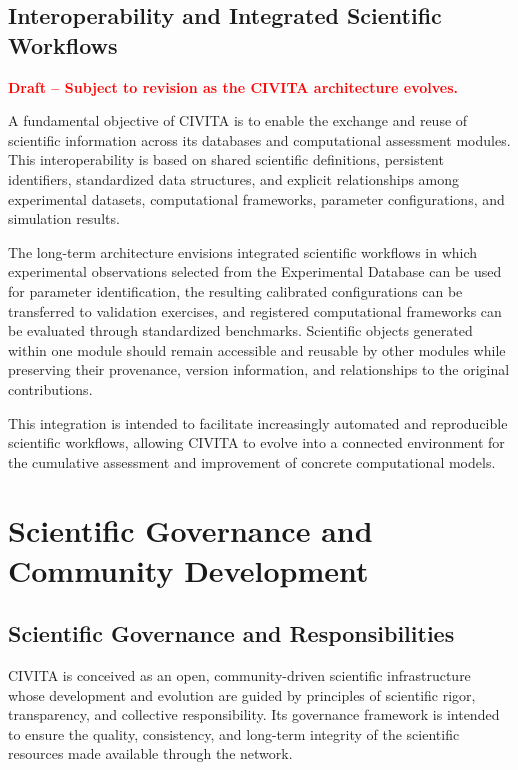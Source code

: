 \section{Interoperability and Integrated Scientific Workflows}
\label{sec:civita-interoperability}

\noindent\textcolor{red}{\textbf{Draft -- Subject to revision as the CIVITA architecture evolves.}}

A fundamental objective of CIVITA is to enable the exchange and reuse of scientific information across its databases and computational assessment modules. This interoperability is based on shared scientific definitions, persistent identifiers, standardized data structures, and explicit relationships among experimental datasets, computational frameworks, parameter configurations, and simulation results.

The long-term architecture envisions integrated scientific workflows in which experimental observations selected from the Experimental Database can be used for parameter identification, the resulting calibrated configurations can be transferred to validation exercises, and registered computational frameworks can be evaluated through standardized benchmarks. Scientific objects generated within one module should remain accessible and reusable by other modules while preserving their provenance, version information, and relationships to the original contributions.

This integration is intended to facilitate increasingly automated and reproducible scientific workflows, allowing CIVITA to evolve into a connected environment for the cumulative assessment and improvement of concrete computational models.


\chapter{Scientific Governance and Community Development}

\section{Scientific Governance and Responsibilities}

CIVITA is conceived as an open, community-driven scientific infrastructure whose development and evolution are guided by principles of scientific rigor, transparency, and collective responsibility. Its governance framework is intended to ensure the quality, consistency, and long-term integrity of the scientific resources made available through the network.

